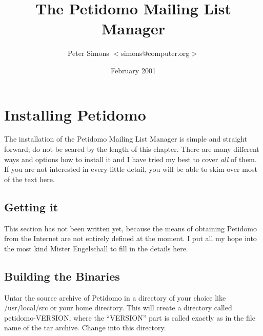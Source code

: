 \documentclass[a4paper,10pt]{scrreprt}
\begin{document}
\title{The Petidomo Mailing List Manager}
\author{Peter Simons $<$simons@computer.org$>$}
\date{February 2001}
\maketitle
\tableofcontents
\clearpage

\chapter{Installing Petidomo}

The installation of the Petidomo Mailing List Manager is simple and
straight forward; do not be scared by the length of this chapter.
There are many different ways and options how to install it and I have
tried my best to cover \emph{all} of them. If you are not interested
in every little detail, you will be able to skim over most of the text
here.

\section{Getting it}

    {\sf This section has not been written yet, because the means of
    obtaining Petidomo from the Internet are not entirely defined at
    the moment. I put all my hope into the most kind Mister
    Engelschall to fill in the details here. }

\section{Building the Binaries}

Untar the source archive of Petidomo in a directory of your choice
like {\sf /usr/local/src} or your home directory. This will create a
directory called {\sf petidomo-VERSION}, where the ``{\sf VERSION}''
part is called exactly as in the file name of the tar archive. Change
into this directory.
\end{document}
